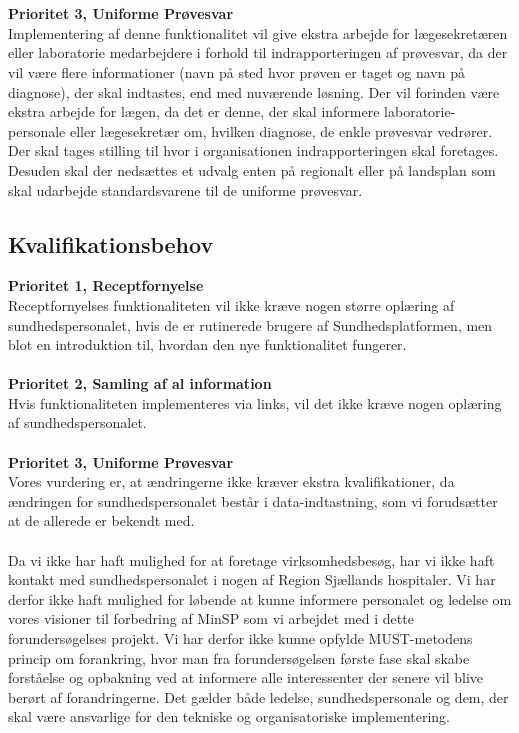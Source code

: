 \\\\
\textbf{Prioritet 3, Uniforme Prøvesvar} \\
Implementering af denne funktionalitet vil give ekstra arbejde for lægesekretæren eller laboratorie medarbejdere i forhold til indrapporteringen af prøvesvar, da der vil være flere informationer (navn på sted hvor prøven er taget og navn på diagnose), der skal indtastes, end med nuværende løsning. Der vil forinden være ekstra arbejde for lægen, da det er denne, der skal informere laboratorie-personale eller lægesekretær om, hvilken diagnose, de enkle prøvesvar vedrører.\\
Der skal tages stilling til hvor i organisationen indrapporteringen skal foretages. Desuden skal der nedsættes et udvalg enten på regionalt eller på landsplan som skal udarbejde standardsvarene til de uniforme prøvesvar.
\subsection{Kvalifikationsbehov}
\textbf{Prioritet 1, Receptfornyelse} \\
Receptfornyelses funktionaliteten vil ikke kræve nogen større oplæring af sundhedspersonalet, hvis de er rutinerede brugere af Sundhedsplatformen, men blot en introduktion til, hvordan den nye funktionalitet fungerer.
\\\\
\textbf{Prioritet 2, Samling af al information} \\
Hvis funktionaliteten implementeres via links, vil det ikke kræve nogen oplæring af sundhedspersonalet.
\\\\
\textbf{Prioritet 3, Uniforme Prøvesvar} \\
Vores vurdering er, at ændringerne ikke kræver ekstra kvalifikationer, da ændringen for sundhedspersonalet består i data-indtastning, som vi forudsætter at de allerede er bekendt med.
\\\\
Da vi ikke har haft mulighed for at foretage virksomhedsbesøg, har vi ikke haft kontakt med sundhedspersonalet i nogen af Region Sjællands hospitaler. Vi har derfor ikke haft mulighed for løbende at kunne informere personalet og ledelse om vores visioner til forbedring af MinSP som vi arbejdet med i dette forundersøgelses projekt. Vi har derfor ikke kunne opfylde MUST-metodens princip om forankring, hvor man fra forundersøgelsen første fase skal skabe forståelse og opbakning ved at informere alle interessenter der senere vil blive berørt af forandringerne. Det gælder både ledelse, sundhedspersonale og dem, der skal være ansvarlige for den tekniske og organisatoriske implementering.

